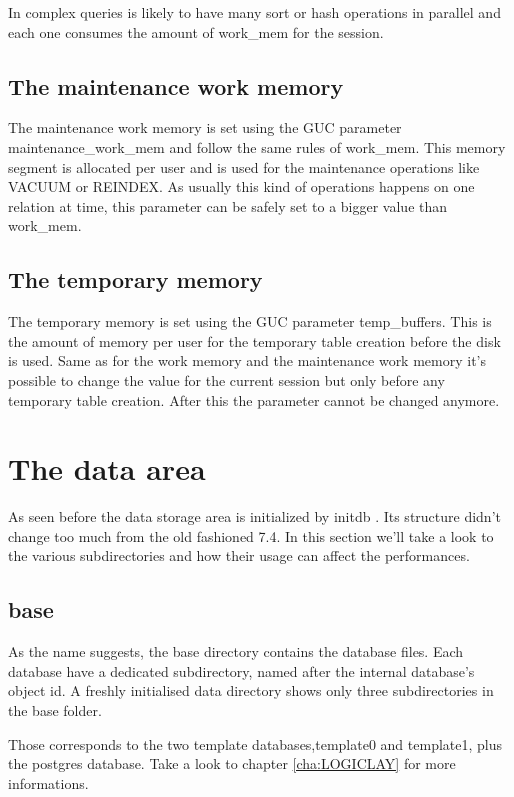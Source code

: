 In complex queries is likely to have many sort or hash operations in parallel 
and each one consumes the amount of work\_mem for the 
session.


\subsection{The maintenance work memory}
The maintenance work memory is set using the GUC parameter 
maintenance\_work\_mem and follow the same rules of work\_mem. This memory 
segment is allocated per user and is used for the maintenance operations 
like VACUUM or REINDEX. As usually this kind of operations happens on one 
relation at time, this parameter can be safely set to a bigger value than 
work\_mem.

\subsection{The temporary memory}
\label{sub:TEMPBUF}
The temporary memory is set using the GUC parameter temp\_buffers. This is the 
amount of memory per user for the temporary table creation before the disk is 
used. Same as for the work memory and the maintenance work memory it's possible 
to change the value for the current session but only before any temporary table 
creation. After this the parameter cannot be changed anymore.


\section{The data area}
\label{sec:PGDATA}
As seen before the data storage area is initialized by initdb .
Its structure didn't change too much from the old fashioned 7.4.
In this section we'll take a look to the various subdirectories and how their 
usage can affect the performances. 


\subsection{base}
\label{sub:BASE}
As the name suggests, the base directory contains the database files. Each 
database have a dedicated subdirectory, named after the internal database's 
object id.
A freshly initialised data directory shows only three 
subdirectories in the base folder.

Those corresponds to the two template databases,template0 and template1, plus 
the postgres database. Take a look to chapter \ref{cha:LOGICLAY} for more 
informations.

